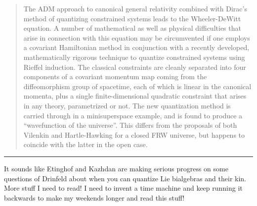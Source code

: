 \documentclass{article}
\renewcommand{\texttt}[1]{%
  \begingroup
  \ttfamily
  \begingroup\lccode`~=`/\lowercase{\endgroup\def~}{/\discretionary{}{}{}}%
  \begingroup\lccode`~=`[\lowercase{\endgroup\def~}{[\discretionary{}{}{}}%
  \begingroup\lccode`~=`.\lowercase{\endgroup\def~}{.\discretionary{}{}{}}%
  \catcode`/=\active\catcode`[=\active\catcode`.=\active
  \scantokens{#1\noexpand}%
  \endgroup
}
\begin{document}
\begin{quote}
The ADM approach to canonical general relativity combined with Dirac's
method of quantizing constrained systems leads to the Wheeler-DeWitt
equation. A number of mathematical as well as physical difficulties that
arise in connection with this equation may be circumvented if one
employs a covariant Hamiltonian method in conjunction with a recently
developed, mathematically rigorous technique to quantize constrained
systems using Rieffel induction. The classical constraints are cleanly
separated into four components of a covariant momentum map coming from
the diffeomorphism group of spacetime, each of which is linear in the
canonical momenta, plus a single finite-dimensional quadratic constraint
that arises in any theory, parametrized or not. The new quantization
method is carried through in a minisuperspace example, and is found to
produce a ``wavefunction of the universe''. This differs from the
proposals of both Vilenkin and Hartle-Hawking for a closed FRW universe,
but happens to coincide with the latter in the open case.
\end{quote}

\begin{center}\rule{0.5\linewidth}{0.5pt}\end{center}


It sounds like Etinghof and Kazhdan are making serious progress on some
questions of Drinfeld about when you can quantize Lie bialgebras and
their kin. More stuff I need to read! I need to invent a time machine
and keep running it backwards to make my weekends longer and read this
stuff!

\end{document}
